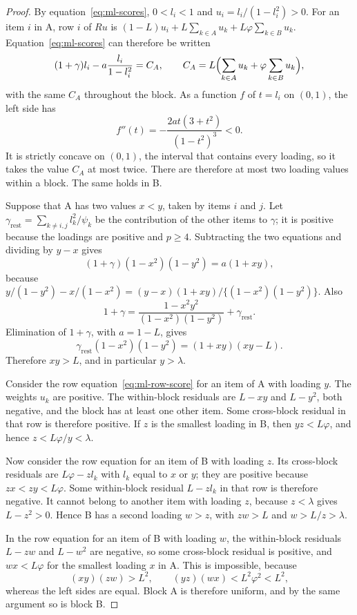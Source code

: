\begin{proof}
By equation~\eqref{eq:ml-scores}, $0<l_i<1$ and $u_i=l_i/(1-l_i^2)>0$. For an item $i$ in A, row $i$ of $Ru$ is $(1-L)u_i+L\sum_{k\in A}u_k+L\varphi\sum_{k\in B}u_k$. Equation~\eqref{eq:ml-scores} can therefore be written
\[
(1+\gamma)l_i-a\frac{l_i}{1-l_i^2}=C_A,
\qquad
C_A=L\Bigl(\sum_{k\in A}u_k+\varphi\sum_{k\in B}u_k\Bigr),
\]
with the same $C_A$ throughout the block. As a function $f$ of $t=l_i$ on $(0,1)$, the left side has
\[
f''(t)=-\frac{2at(3+t^2)}{(1-t^2)^3}<0 .
\]
It is strictly concave on $(0,1)$, the interval that contains every loading, so it takes the value $C_A$ at most twice. There are therefore at most two loading values within a block. The same holds in B.

Suppose that A has two values $x<y$, taken by items $i$ and $j$. Let $\gamma_{\mathrm{rest}}=\sum_{k\ne i,j}l_k^2/\psi_k$ be the contribution of the other items to $\gamma$; it is positive because the loadings are positive and $p\ge4$. Subtracting the two equations and dividing by $y-x$ gives
\[
(1+\gamma)(1-x^2)(1-y^2)=a(1+xy),
\]
because $y/(1-y^2)-x/(1-x^2)=(y-x)(1+xy)/\{(1-x^2)(1-y^2)\}$. Also
\[
1+\gamma=\frac{1-x^2y^2}{(1-x^2)(1-y^2)}+\gamma_{\mathrm{rest}} .
\]
Elimination of $1+\gamma$, with $a=1-L$, gives
\[
\gamma_{\mathrm{rest}}(1-x^2)(1-y^2)=(1+xy)(xy-L).
\]
Therefore $xy>L$, and in particular $y>\lambda$.

Consider the row equation~\eqref{eq:ml-row-score} for an item of A with loading $y$. The weights $u_k$ are positive. The within-block residuals are $L-xy$ and $L-y^2$, both negative, and the block has at least one other item. Some cross-block residual in that row is therefore positive. If $z$ is the smallest loading in B, then $yz<L\varphi$, and hence $z<L\varphi/y<\lambda$.

Now consider the row equation for an item of B with loading $z$. Its cross-block residuals are $L\varphi-zl_k$ with $l_k$ equal to $x$ or $y$; they are positive because $zx<zy<L\varphi$. Some within-block residual $L-zl_k$ in that row is therefore negative. It cannot belong to another item with loading $z$, because $z<\lambda$ gives $L-z^2>0$. Hence B has a second loading $w>z$, with $zw>L$ and $w>L/z>\lambda$.

In the row equation for an item of B with loading $w$, the within-block residuals $L-zw$ and $L-w^2$ are negative, so some cross-block residual is positive, and $wx<L\varphi$ for the smallest loading $x$ in A. This is impossible, because
\[
(xy)(zw)>L^2,
\qquad
(yz)(wx)<L^2\varphi^2<L^2,
\]
whereas the left sides are equal. Block A is therefore uniform, and by the same argument so is block B.
\end{proof}

